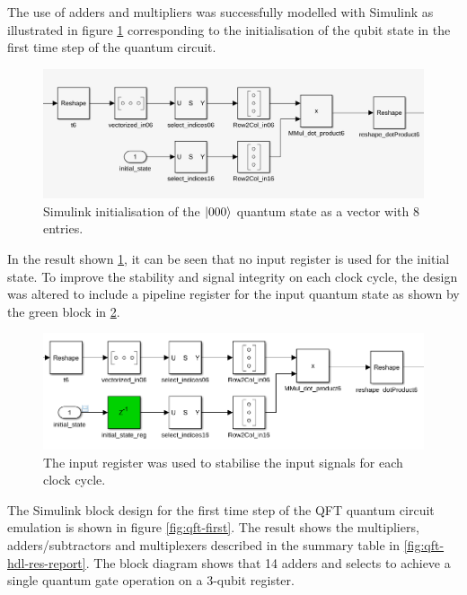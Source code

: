 The use of adders and multipliers was successfully modelled with Simulink as illustrated in figure \ref{fig:qft-simulink-1} corresponding to the initialisation of the qubit state in the first time step of the quantum circuit.
\begin{figure}[!ht]
	\centering
	\includegraphics[width=\linewidth]{body/ch6/figs/qft-simulink-1}
	\caption[Initial Simulink Design Block for the QFT Quantum Circuit Described in MATLAB.]{Simulink initialisation of the $\ket{000}$ quantum state as a vector with 8 entries.}
	\label{fig:qft-simulink-1}
\end{figure}
In the result shown \ref{fig:qft-simulink-1}, it can be seen that no input register is used for the initial state. To improve the stability and signal integrity on each clock cycle, the design was altered to include a pipeline register for the input quantum state as shown by the green block in \ref{fig:qft-simulink-12}.
\begin{figure}[!ht]
	\centering
	\includegraphics[width=\linewidth]{body/ch6/figs/qft-simulink-12}
	\caption[Showing the Simulink Model of the Input Quantum State with a Pipeline Register.]{The input register was used to stabilise the input signals for each clock cycle.}
	\label{fig:qft-simulink-12}
\end{figure}
The Simulink block design for the first time step of the QFT quantum circuit emulation is shown in figure \ref{fig:qft-first}. The result shows the multipliers, adders/subtractors and multiplexers described in the summary table in \ref{fig:qft-hdl-res-report}. The block diagram shows that 14 adders and selects to achieve a single quantum gate operation on a 3-qubit register.
